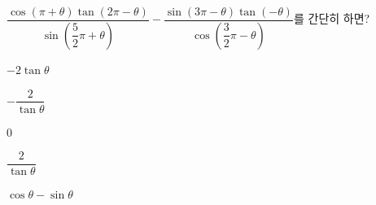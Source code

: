 $\dfrac{\cos(\pi+\theta)\tan(2\pi-\theta)}{\sin\left(\dfrac{5}{2}\pi+\theta\right)}-\dfrac{\sin(3\pi-\theta)\tan(-\theta)}{\cos\left(\dfrac{3}{2}\pi-\theta\right)}$를 간단히 하면?
\begin{choices32}{\rule[-3ex]{0pt}{8ex}$-2\tan\theta$}{\rule[-3ex]{0pt}{8ex}$-\dfrac{2}{\tan\theta}$}{\rule[-3ex]{0pt}{8ex}$0$}{\rule[-3ex]{0pt}{8ex}$\dfrac{2}{\tan\theta}$}{\rule[-3ex]{0pt}{8ex}$\cos\theta-\sin\theta$}\end{choices32}
